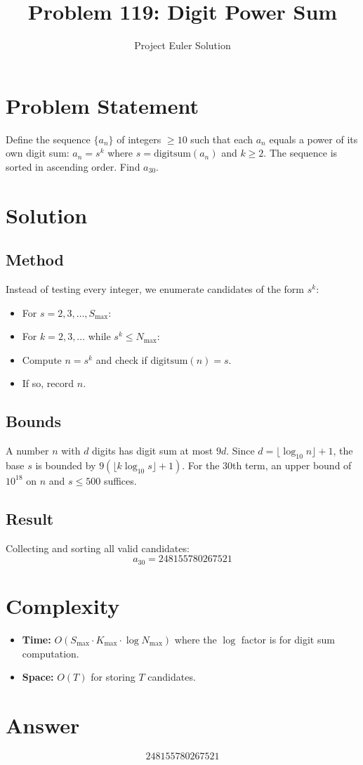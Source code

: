 \documentclass[12pt]{article}
\title{Problem 119: Digit Power Sum}
\author{Project Euler Solution}
\date{}
\begin{document}
\maketitle

\section{Problem Statement}
Define the sequence $\{a_n\}$ of integers $\ge 10$ such that each $a_n$ equals a power of its own digit sum: $a_n = s^k$ where $s = \text{digitsum}(a_n)$ and $k \ge 2$. The sequence is sorted in ascending order. Find $a_{30}$.

\section{Solution}

\subsection{Method}
Instead of testing every integer, we enumerate candidates of the form $s^k$:
\begin{itemize}
\item For $s = 2, 3, \ldots, S_{\max}$:
\item For $k = 2, 3, \ldots$ while $s^k \le N_{\max}$:
\item Compute $n = s^k$ and check if $\text{digitsum}(n) = s$.
\item If so, record $n$.
\end{itemize}

\subsection{Bounds}
A number $n$ with $d$ digits has digit sum at most $9d$. Since $d = \lfloor \log_{10} n \rfloor + 1$, the base $s$ is bounded by $9(\lfloor k \log_{10} s \rfloor + 1)$. For the 30th term, an upper bound of $10^{18}$ on $n$ and $s \le 500$ suffices.

\subsection{Result}
Collecting and sorting all valid candidates:
\[
\boxed{a_{30} = 248155780267521}
\]

\section{Complexity}
\begin{itemize}
\item \textbf{Time:} $O(S_{\max} \cdot K_{\max} \cdot \log N_{\max})$ where the $\log$ factor is for digit sum computation.
\item \textbf{Space:} $O(T)$ for storing $T$ candidates.
\end{itemize}

\section{Answer}

\[
\boxed{248155780267521}
\]
\end{document}
